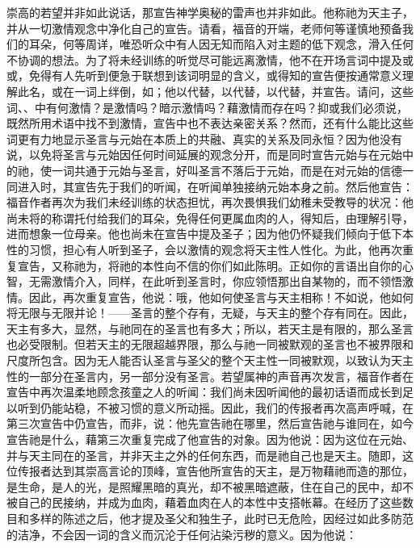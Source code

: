 崇高的若望并非如此说话，那宣告神学奥秘的雷声也并非如此。他称祂为天主子，并从一切激情观念中净化自己的宣告。请看，福音的开端，老师何等谨慎地预备我们的耳朵，何等周详，唯恐听众中有人因无知而陷入对主题的低下观念，滑入任何不协调的想法。为了将未经训练的听觉尽可能远离激情，他不在开场言词中提及或或，免得有人先听到便急于联想到该词明显的含义，或得知的宣告便按通常意义理解此名，或在一词上绊倒，如；他以代替，以代替，以代替，并宣告。请问，这些词、、中有何激情？是激情吗？暗示激情吗？藉激情而存在吗？抑或我们必须说，既然所用术语中找不到激情，宣告中也不表达亲密关系？然而，还有什么能比这些词更有力地显示圣言与元始在本质上的共融、真实的关系及同永恒？因为他没有说，以免将圣言与元始因任何时间延展的观念分开，而是同时宣告元始与在元始中的祂，使一词共通于元始与圣言，好叫圣言不落后于元始，而是在对元始的信德一同进入时，其宣告先于我们的听闻，在听闻单独接纳元始本身之前。然后他宣告：福音作者再次为我们未经训练的状态担忧，再次畏惧我们幼稚未受教导的状况：他尚未将的称谓托付给我们的耳朵，免得任何更属血肉的人，得知后，由理解引导，进而想象一位母亲。他也尚未在宣告中提及圣子；因为他仍怀疑我们倾向于低下本性的习惯，担心有人听到圣子，会以激情的观念将天主性人性化。为此，他再次重复宣告，又称祂为，将祂的本性向不信的你们如此陈明。正如你的言语出自你的心智，无需激情介入，同样，在此听到圣言时，你应领悟那出自某物的，而不领悟激情。因此，再次重复宣告，他说：哦，他如何使圣言与天主相称！不如说，他如何将无限与无限并论！——圣言的整个存有，无疑，与天主的整个存有同在。因此，天主有多大，显然，与祂同在的圣言也有多大；所以，若天主是有限的，那么圣言也必受限制。但若天主的无限超越界限，那么与祂一同被默观的圣言也不被界限和尺度所包含。因为无人能否认圣言与圣父的整个天主性一同被默观，以致认为天主性的一部分在圣言内，另一部分没有圣言。若望属神的声音再次发言，福音作者在宣告中再次温柔地顾念孩童之人的听闻：我们尚未因听闻他的最初话语而成长到足以听到仍能站稳，不被习惯的意义所动摇。因此，我们的传报者再次高声呼喊，在第三次宣告中仍宣告，而非，说：他先宣告祂在哪里，然后宣告祂与谁同在，如今宣告祂是什么，藉第三次重复完成了他宣告的对象。因为他说：因为这位在元始、并与天主同在的圣言，并非天主之外的任何东西，而是祂自己也是天主。随即，这位传报者达到其崇高言论的顶峰，宣告他所宣告的天主，是万物藉祂而造的那位，是生命，是人的光，是照耀黑暗的真光，却不被黑暗遮蔽，住在自己的民中，却不被自己的民接纳，并成为血肉，藉着血肉在人的本性中支搭帐幕。在经历了这些数目和多样的陈述之后，他才提及圣父和独生子，此时已无危险，因经过如此多防范的洁净，不会因一词的含义而沉沦于任何沾染污秽的意义。因为他说：\par

